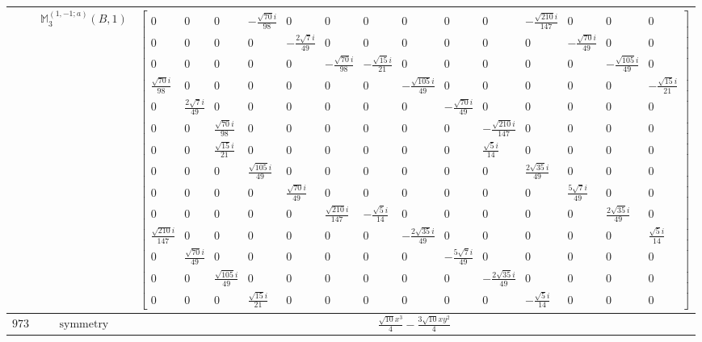 \documentclass[fleqn,8pt,landscape]{jsarticle}
\begin{document}
\begin{longtable}{ccc}
$  $ & $ \mathbb{M}_{3}^{(1,-1;a)}(B,1) $ & $ \begin{bmatrix} 0 & 0 & 0 & - \frac{\sqrt{70} i}{98} & 0 & 0 & 0 & 0 & 0 & 0 & - \frac{\sqrt{210} i}{147} & 0 & 0 & 0 \\ 0 & 0 & 0 & 0 & - \frac{2 \sqrt{7} i}{49} & 0 & 0 & 0 & 0 & 0 & 0 & - \frac{\sqrt{70} i}{49} & 0 & 0 \\ 0 & 0 & 0 & 0 & 0 & - \frac{\sqrt{70} i}{98} & - \frac{\sqrt{15} i}{21} & 0 & 0 & 0 & 0 & 0 & - \frac{\sqrt{105} i}{49} & 0 \\ \frac{\sqrt{70} i}{98} & 0 & 0 & 0 & 0 & 0 & 0 & - \frac{\sqrt{105} i}{49} & 0 & 0 & 0 & 0 & 0 & - \frac{\sqrt{15} i}{21} \\ 0 & \frac{2 \sqrt{7} i}{49} & 0 & 0 & 0 & 0 & 0 & 0 & - \frac{\sqrt{70} i}{49} & 0 & 0 & 0 & 0 & 0 \\ 0 & 0 & \frac{\sqrt{70} i}{98} & 0 & 0 & 0 & 0 & 0 & 0 & - \frac{\sqrt{210} i}{147} & 0 & 0 & 0 & 0 \\ 0 & 0 & \frac{\sqrt{15} i}{21} & 0 & 0 & 0 & 0 & 0 & 0 & \frac{\sqrt{5} i}{14} & 0 & 0 & 0 & 0 \\ 0 & 0 & 0 & \frac{\sqrt{105} i}{49} & 0 & 0 & 0 & 0 & 0 & 0 & \frac{2 \sqrt{35} i}{49} & 0 & 0 & 0 \\ 0 & 0 & 0 & 0 & \frac{\sqrt{70} i}{49} & 0 & 0 & 0 & 0 & 0 & 0 & \frac{5 \sqrt{7} i}{49} & 0 & 0 \\ 0 & 0 & 0 & 0 & 0 & \frac{\sqrt{210} i}{147} & - \frac{\sqrt{5} i}{14} & 0 & 0 & 0 & 0 & 0 & \frac{2 \sqrt{35} i}{49} & 0 \\ \frac{\sqrt{210} i}{147} & 0 & 0 & 0 & 0 & 0 & 0 & - \frac{2 \sqrt{35} i}{49} & 0 & 0 & 0 & 0 & 0 & \frac{\sqrt{5} i}{14} \\ 0 & \frac{\sqrt{70} i}{49} & 0 & 0 & 0 & 0 & 0 & 0 & - \frac{5 \sqrt{7} i}{49} & 0 & 0 & 0 & 0 & 0 \\ 0 & 0 & \frac{\sqrt{105} i}{49} & 0 & 0 & 0 & 0 & 0 & 0 & - \frac{2 \sqrt{35} i}{49} & 0 & 0 & 0 & 0 \\ 0 & 0 & 0 & \frac{\sqrt{15} i}{21} & 0 & 0 & 0 & 0 & 0 & 0 & - \frac{\sqrt{5} i}{14} & 0 & 0 & 0 \end{bmatrix} $ \\ \hline
$ 973 $ & $ \text{symmetry} $ & $ \frac{\sqrt{10} x^{3}}{4} - \frac{3 \sqrt{10} x y^{2}}{4} $ \\

\end{longtable}
\end{document}
